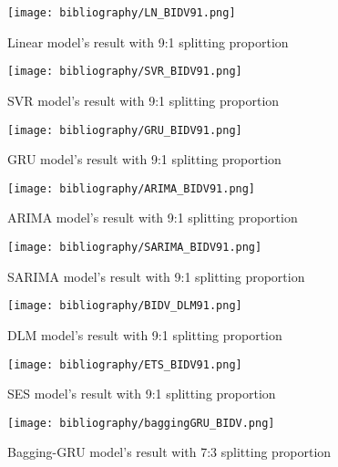 \documentclass{ieeeojies}
\begin{document}
\begin{figure}[H]
  \centering
  \begin{minipage}{0.8\linewidth}
    \centering
    \texttt{[image: bibliography/LN\_BIDV91.png]}
    \caption{Linear model's result with 9:1 splitting proportion}
    \label{fig22}
  \end{minipage}
\end{figure}
\begin{figure}[H]
  \centering
  \begin{minipage}{0.8\linewidth}
    \centering
    \texttt{[image: bibliography/SVR\_BIDV91.png]}
    \caption{SVR model's result with 9:1 splitting proportion}
    \label{fig23}
  \end{minipage}
\end{figure}
\begin{figure}[H]
  \centering
  \begin{minipage}{0.8\linewidth}
    \centering
    \texttt{[image: bibliography/GRU\_BIDV91.png]}
    \caption{GRU model's result with 9:1 splitting proportion}
    \label{fig24}
  \end{minipage}
\end{figure}
\begin{figure}[H]
  \centering
  \begin{minipage}{0.8\linewidth}
    \centering
    \texttt{[image: bibliography/ARIMA\_BIDV91.png]}
    \caption{ARIMA model's result with 9:1 splitting proportion}
    \label{fig25}
  \end{minipage}
\end{figure}
\begin{figure}[H]
  \centering
  \begin{minipage}{0.8\linewidth}
    \centering
    \texttt{[image: bibliography/SARIMA\_BIDV91.png]}
    \caption{SARIMA model's result with 9:1 splitting proportion}
    \label{fig26}
  \end{minipage}
\end{figure}
\begin{figure}[H]
  \centering
  \begin{minipage}{0.8\linewidth}
    \centering
        \texttt{[image: bibliography/BIDV\_DLM91.png]}
    \caption{DLM model's result with 9:1 splitting proportion}
    \label{fig27}
  \end{minipage}
\end{figure}
\begin{figure}[H]
  \centering
  \begin{minipage}{0.8\linewidth}
    \centering
        \texttt{[image: bibliography/ETS\_BIDV91.png]}
    \caption{SES model's result with 9:1 splitting proportion}
    \label{fig28}
  \end{minipage}
\end{figure}
\begin{figure}[H]
  \centering
  \begin{minipage}{0.8\linewidth}
    \centering
        \texttt{[image: bibliography/baggingGRU\_BIDV.png]}
    \caption{Bagging-GRU model's result with 7:3 splitting proportion}
    \label{fig28}
  \end{minipage}
\end{figure}
\end{document}
